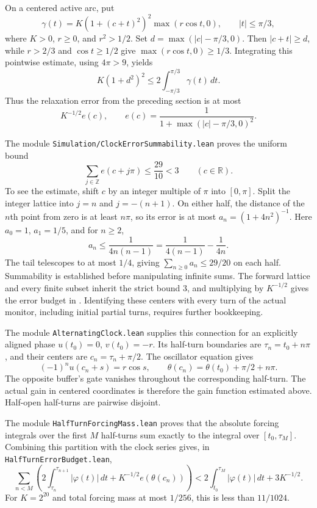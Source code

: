 \documentclass[11pt]{article}
\newcommand{\R}{\mathbb R}
\newcommand{\Z}{\mathbb Z}
\newcommand{\code}[1]{{\small\nolinkurl{#1}}}
\begin{document}
On a centered active arc, put
\[
 \gamma(t)=K(1+(c+t)^2)^2\max(r\cos t,0),
 \qquad |t|\le\pi/3,
\]
where $K>0$, $r\ge0$, and $r^2>1/2$. Set
$d=\max(|c|-\pi/3,0)$. Then $|c+t|\ge d$, while
$r>2/3$ and $\cos t\ge1/2$ give $\max(r\cos t,0)\ge1/3$.
Integrating this pointwise estimate, using $4\pi>9$, yields
\[
 K(1+d^2)^2\le2\int_{-\pi/3}^{\pi/3}\gamma(t)\,dt.
\]
Thus the relaxation error from the preceding section is at most
\[
 K^{-1/2}e(c),\qquad
 e(c)=\frac1{1+\max(|c|-\pi/3,0)^2}.
\]

The module \code{Simulation/ClockErrorSummability.lean} proves the uniform
bound
\[
 \sum_{j\in\Z}e(c+j\pi)\le\frac{29}{10}<3
 \qquad(c\in\R).
\]
To see the estimate, shift $c$ by an integer multiple of $\pi$ into
$[0,\pi]$. Split the integer lattice into $j=n$ and $j=-(n+1)$.
On either half, the distance of the $n$th point from zero is at least
$n\pi$, so its error is at most $a_n=(1+4n^2)^{-1}$. Here $a_0=1$,
$a_1=1/5$, and for $n\ge2$,
\[
 a_n\le\frac1{4n(n-1)}
       =\frac1{4(n-1)}-\frac1{4n}.
\]
The tail telescopes to at most $1/4$, giving
$\sum_{n\ge0}a_n\le29/20$ on each half. Summability is established
before manipulating infinite sums. The forward lattice and every finite
subset inherit the strict bound $3$, and multiplying by $K^{-1/2}$ gives
the error budget in \cite[Lemma 4.2]{korda}. Identifying these centers with
every turn of the actual monitor, including initial partial turns, requires
further bookkeeping.

The module \code{AlternatingClock.lean} supplies this connection for an
explicitly aligned phase $u(t_0)=0$, $v(t_0)=-r$. Its half-turn boundaries
are $\tau_n=t_0+n\pi$, and their centers are $c_n=\tau_n+\pi/2$.
The oscillator equation gives
\[
 (-1)^n u(c_n+s)=r\cos s,\qquad
 \theta(c_n)=\theta(t_0)+\pi/2+n\pi.
\]
The opposite buffer's gate vanishes throughout the corresponding
half-turn. The actual gain in centered coordinates is therefore the
gain function estimated above. Half-open half-turns are pairwise disjoint.

The module \code{HalfTurnForcingMass.lean} proves that the absolute
forcing integrals over the first $M$ half-turns sum exactly to the
integral over $[t_0,\tau_M]$. Combining this partition with the clock
series gives, in \code{HalfTurnErrorBudget.lean},
\[
 \sum_{n<M}\left(2\int_{\tau_n}^{\tau_{n+1}}|\varphi(t)|\,dt
       +K^{-1/2}e(\theta(c_n))\right)
 <2\int_{t_0}^{\tau_M}|\varphi(t)|\,dt+3K^{-1/2}.
\]
For $K=2^{20}$ and total forcing mass at most $1/256$, this is less than
$11/1024$.
\end{document}
